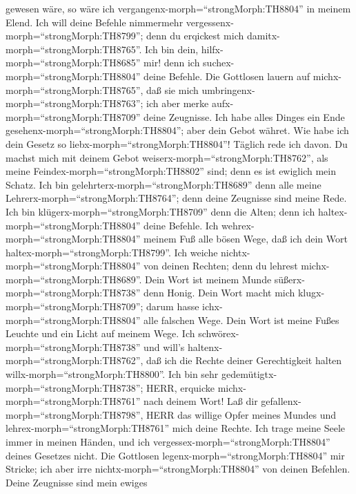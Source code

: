 gewesen wäre, so wäre ich vergangenx-morph=``strongMorph:TH8804'' in
meinem Elend.  Ich will deine Befehle nimmermehr
vergessenx-morph=``strongMorph:TH8799''; denn du erqickest mich
damitx-morph=``strongMorph:TH8765''.  Ich bin dein,
hilfx-morph=``strongMorph:TH8685'' mir! denn ich
suchex-morph=``strongMorph:TH8804'' deine Befehle.  Die
Gottlosen lauern auf michx-morph=``strongMorph:TH8765'', daß sie mich
umbringenx-morph=``strongMorph:TH8763''; ich aber merke
aufx-morph=``strongMorph:TH8709'' deine Zeugnisse.  Ich
habe alles Dinges ein Ende gesehenx-morph=``strongMorph:TH8804''; aber
dein Gebot währet.  Wie habe ich dein Gesetz so
liebx-morph=``strongMorph:TH8804''! Täglich rede ich davon.
 Du machst mich mit deinem Gebot
weiserx-morph=``strongMorph:TH8762'', als meine
Feindex-morph=``strongMorph:TH8802'' sind; denn es ist ewiglich mein
Schatz.  Ich bin gelehrterx-morph=``strongMorph:TH8689''
denn alle meine Lehrerx-morph=``strongMorph:TH8764''; denn deine
Zeugnisse sind meine Rede.  Ich bin
klügerx-morph=``strongMorph:TH8709'' denn die Alten; denn ich
haltex-morph=``strongMorph:TH8804'' deine Befehle.  Ich
wehrex-morph=``strongMorph:TH8804'' meinem Fuß alle bösen Wege, daß ich
dein Wort haltex-morph=``strongMorph:TH8799''.  Ich weiche
nichtx-morph=``strongMorph:TH8804'' von deinen Rechten; denn du lehrest
michx-morph=``strongMorph:TH8689''.  Dein Wort ist meinem
Munde süßerx-morph=``strongMorph:TH8738'' denn Honig. 
Dein Wort macht mich klugx-morph=``strongMorph:TH8709''; darum hasse
ichx-morph=``strongMorph:TH8804'' alle falschen Wege. 
Dein Wort ist meine Fußes Leuchte und ein Licht auf meinem Wege.
 Ich schwörex-morph=``strongMorph:TH8738'' und will's
haltenx-morph=``strongMorph:TH8762'', daß ich die Rechte deiner
Gerechtigkeit halten willx-morph=``strongMorph:TH8800''. 
Ich bin sehr gedemütigtx-morph=``strongMorph:TH8738''; HERR, erquicke
michx-morph=``strongMorph:TH8761'' nach deinem Wort!  Laß
dir gefallenx-morph=``strongMorph:TH8798'', HERR das willige Opfer
meines Mundes und lehrex-morph=``strongMorph:TH8761'' mich deine Rechte.
 Ich trage meine Seele immer in meinen Händen, und ich
vergessex-morph=``strongMorph:TH8804'' deines Gesetzes nicht.
 Die Gottlosen legenx-morph=``strongMorph:TH8804'' mir
Stricke; ich aber irre nichtx-morph=``strongMorph:TH8804'' von deinen
Befehlen.  Deine Zeugnisse sind mein ewiges
